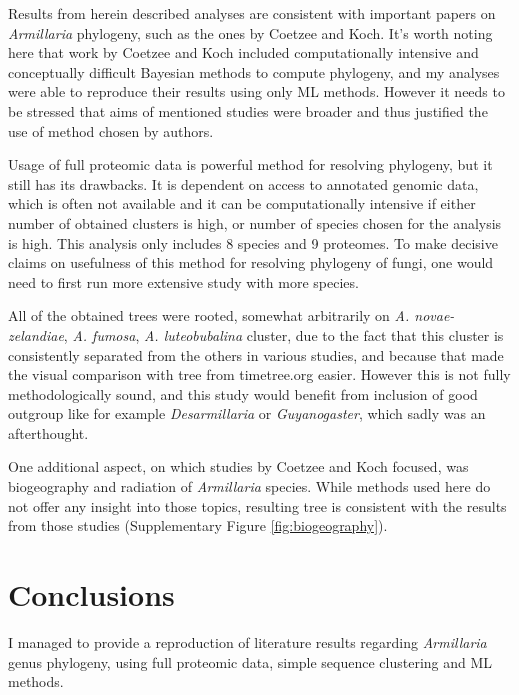\documentclass[two column, twoside, a4paper]{article}
\begin{document}
Results from herein described analyses are consistent with important papers on \textit{Armillaria} phylogeny, such as the ones by Coetzee and Koch\autocite{Coetzee2011, Coetzee2018, Koch2017}. It's worth noting here that work by Coetzee and Koch included computationally intensive and conceptually difficult Bayesian methods to compute phylogeny, and my analyses were able to reproduce their results using only ML methods. However it needs to be stressed that aims of mentioned studies were broader and thus justified the use of method chosen by authors. 

Usage of full proteomic data is powerful method for resolving phylogeny, but it still has its drawbacks. It is dependent on access to annotated genomic data, which is often not available and it can be computationally intensive if either number of obtained clusters is high, or number of species chosen for the analysis is high. This analysis only includes 8 species and 9 proteomes. To make decisive claims on usefulness of this method for resolving phylogeny of fungi, one would need to first run more extensive study with more species. 

All of the obtained trees were rooted, somewhat arbitrarily on \textit{A. novae-zelandiae}, \textit{A. fumosa}, \textit{A. luteobubalina} cluster, due to the fact that this cluster is consistently separated from the others in various studies\autocite{Coetzee2011, Koch2017, Coetzee2018, Liu2023}, and because that made the visual comparison with tree from timetree.org easier. However this is not fully methodologically sound, and this study would benefit from inclusion of good outgroup like for example \textit{Desarmillaria} or \textit{Guyanogaster}\autocite{Koch2017, Coetzee2018}, which sadly was an afterthought.

One additional aspect, on which studies by Coetzee and Koch focused, was biogeography and radiation of \textit{Armillaria} species. While methods used here do not offer any insight into those topics, resulting tree is consistent with the results from those studies (Supplementary Figure \ref{fig:biogeography}).

\section{Conclusions}

I managed to provide a reproduction of literature results regarding \textit{Armillaria} genus phylogeny, using full proteomic data, simple sequence clustering and ML methods. 
\end{document}
